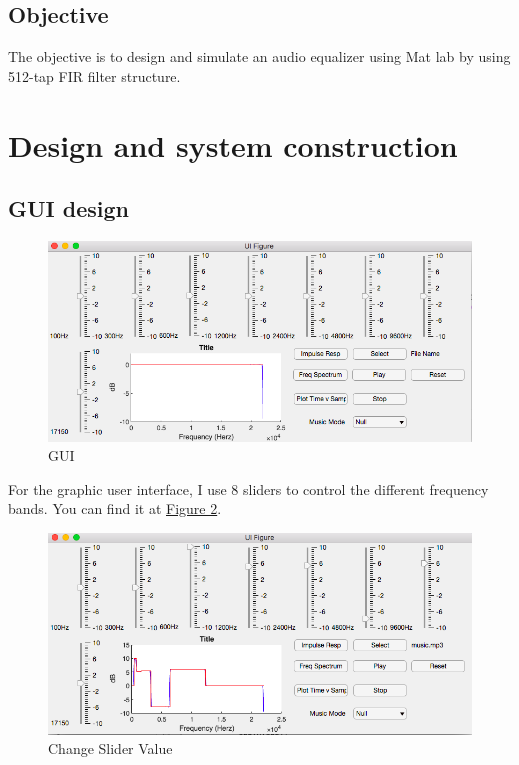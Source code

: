 \documentclass[titlepage]{article}
\begin{document}
\subsection{Objective}
\label{sec:org4d9f0cc}

The objective is to design and simulate an audio equalizer using Mat lab by using 512-tap FIR filter structure.

\newpage

\section{Design and system construction}
\label{sec:org807f460}
\subsection{GUI design}
\label{sec:orgd8df49c}

\begin{figure}[htbp]
\caption{\label{fig:org0f31e34}
GUI}
\centering
\includegraphics[width=12cm]{./img/1.png}
\end{figure}
For the graphic user interface, I use 8 sliders to control the different
frequency bands. You can find it at \hyperref[fig:org0f31e34]{Figure 2}.

\begin{figure}[htbp]
\caption{\label{fig:org01fa1fb}
Change Slider Value}
\centering
\includegraphics[width=12cm]{./img/3.png}
\end{figure}
\end{document}
